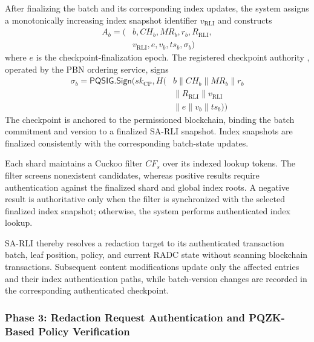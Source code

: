 \documentclass[lettersize,journal]{IEEEtran}
\begin{document}
    After finalizing the batch and its corresponding
    index updates, the system assigns a monotonically
    increasing index snapshot identifier
    $v_{\mathrm{RLI}}$ and constructs
    \begin{equation}
    \begin{aligned}
    A_b=\big(&b,CH_b,MR_b, {r_b,}R_{\mathrm{RLI}},\\&v_{\mathrm{RLI}},e,v_b,ts_b,\sigma_b\big)
    \end{aligned}
    \end{equation}
    where $e$ is the checkpoint-finalization epoch.
    The registered checkpoint authority {, operated by the
    PBN ordering service,} signs
    \begin{equation}
    \begin{aligned}
    \sigma_b=
    \mathsf{PQSIG.Sign}\big(
    sk_{\mathrm{CP}},
    H(&b\parallel CH_b\parallel MR_b {\parallel r_b}\\
    &\parallel R_{\mathrm{RLI}}\parallel v_{\mathrm{RLI}}\\
    &\parallel e\parallel v_b\parallel ts_b)
    \big)
    \end{aligned}
    \end{equation}
    The checkpoint is anchored to the permissioned
    blockchain, binding the batch commitment and
    version to a finalized SA-RLI snapshot. Index
    snapshots are finalized consistently with the
    corresponding batch-state updates.
    
    Each shard maintains a Cuckoo filter $CF_s$
    over its indexed lookup tokens. The filter
    screens nonexistent candidates, whereas
    positive results require authentication
    against the finalized shard and global index
    roots. A negative result is authoritative
    only when the filter is synchronized with
    the selected finalized index snapshot;
    otherwise, the system performs authenticated
    index lookup.
    
    SA-RLI thereby resolves a redaction target
    to its authenticated transaction batch,
    leaf position, policy, and current RADC
    state without scanning blockchain transactions.
    Subsequent content modifications update
    only the affected entries and their index
    authentication paths, while batch-version
    changes are recorded in the corresponding
    authenticated checkpoint.
    
    
    \subsubsection*{\textbf{Phase 3: Redaction Request
    Authentication and PQZK-Based Policy Verification}}
    
\end{document}
